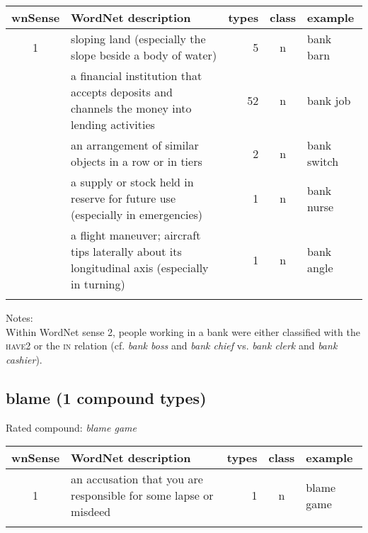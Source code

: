 

\noindent
\begin{longtable}{c>{\raggedright\arraybackslash}p{5.5cm}rc>{\raggedright\arraybackslash}p{1.5cm}}\lsptoprule
{\small wnSense}&WordNet description&types&class&example\\\midrule
1&sloping land (especially the slope beside a body of water)&5&n&bank barn\\\tablevspace
2&a financial institution that accepts deposits and channels the money into lending activities&52&n&bank job\\\tablevspace
4&an arrangement of similar objects in a row or in tiers&2&n&bank switch\\\tablevspace
5&a supply or stock held in reserve for future use (especially in emergencies)&1&n&bank nurse\\\tablevspace
10&a flight maneuver; aircraft tips laterally about its longitudinal axis (especially in turning)&1&n&bank angle\\\lspbottomrule
\end{longtable}
\vspace*{-.2cm}

\noindent
Notes:\\
Within WordNet sense 2, people working in a bank were either classified with the \textsc{have2} or the \textsc{in} relation (cf. \emph{bank boss} and \emph{bank chief} vs. \emph{bank clerk} and \emph{bank cashier}).

\vspace*{-.2cm}
\subsection{blame (1 compound types)}
Rated compound: \emph{blame game}
\vspace*{-.2cm}

\noindent
\begin{longtable}{c>{\raggedright\arraybackslash}p{5cm}rc>{\raggedright\arraybackslash}p{2cm}}\lsptoprule
{\small wnSense}&WordNet description&types&class&example\\\midrule
1&an accusation that you are responsible for some lapse or misdeed&1&n&blame game\\\lspbottomrule
\end{longtable}
\vspace*{-.2cm}


